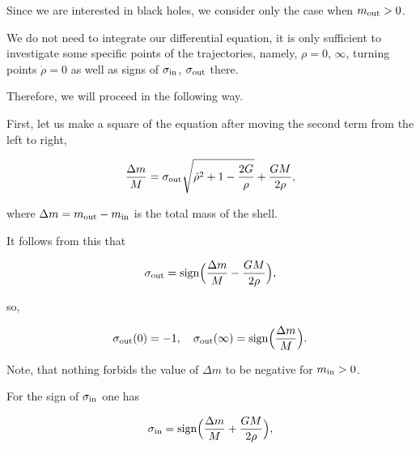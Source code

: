 Since we are interested in black holes, we consider only the case when $m_{\rm out} > 0$. 

We do not need to integrate our differential equation, it is only sufficient to investigate some specific points of the trajectories, namely, $\rho = 0$, $\infty$, turning points $\dot \rho = 0$ as well as signs of $\sigma_{\rm in}$, $\sigma_{\rm out}$ there. 

Therefore, we will proceed in the following way. 

First, let us make a square of the equation after moving the second term from the left to right,

\begin{equation}

\label{sout}

\frac{\Delta m}{M} = \sigma_{\rm out} \sqrt{\dot \rho^2 + 1 - \frac{2 G}{\rho}} + \frac{G M}{2 \rho} ,

\end{equation}

where $\Delta m = m_{\rm out} - m_{\rm in}$ is the total mass of the shell. 

It follows from this that

\begin{equation}

\label{signsout}

\sigma_{\rm out} = \mathop{\rm sign} \Bigl( \frac{\Delta m}{M} - \frac{G M}{2 \rho} \Bigr),

\end{equation}

so,

\begin{gather}

\label{s0inf}

\sigma_{\rm out}(0) =- 1 ,\quad 

\sigma_{\rm out}(\infty) = \mathop{\rm sign} \Bigl(\frac{\Delta m}{M} \Bigr)  .

\end{gather}

Note, that nothing forbids the value of $\Delta m$ to be negative for $m_{\rm in} > 0$. 

For the sign of $\sigma_{\rm in}$ one has

\begin{equation}

\label{signsin}

\sigma_{\rm in} = \mathop{\rm sign} \Bigl( \frac{\Delta m}{M} + \frac{G M}{2 \rho} \Bigr) ,

\end{equation}

